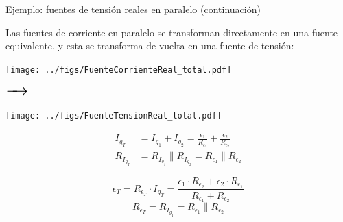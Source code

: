 \documentclass[aspectratio=169, xcolor={usenames,svgnames,dvipsnames}]{beamer}
\begin{document}
\begin{frame}{Ejemplo: \hspace{3mm}fuentes de tensión reales en paralelo \hspace{3mm}(continuación)}

    \vspace{2mm}
    Las fuentes de corriente en paralelo se transforman directamente en una fuente equivalente, y esta se transforma de vuelta en una fuente de tensión:

    \begin{minipage}[c]{0.45\linewidth}
        \begin{center}
        \texttt{[image: ../figs/FuenteCorrienteReal\_total.pdf]}
        \end{center}
    \end{minipage}
    \begin{minipage}[c]{0.08\linewidth}        
        $\LARGE \xrightarrow{\hspace*{0.5cm}}$        
    \end{minipage}
    \begin{minipage}[c]{0.3\linewidth}
        \begin{center}
        \texttt{[image: ../figs/FuenteTensionReal\_total.pdf]}
        \end{center}
    \end{minipage}

    \vspace{-2mm}
    \begin{minipage}[c]{0.45\linewidth}
        \begin{center}
            \begin{align*}
            I_{g_T} &= I_{g_1} + I_{g_2} = \frac{\epsilon_1}{R_{\epsilon_1}} + \frac{\epsilon_2}{R_{\epsilon_2}} \\[2pt]
            R_{I_{g_T}} &= R_{I_{g_1}} \parallel R_{I_{g_2}} = R_{\epsilon_1} \parallel R_{\epsilon_2}
            \end{align*}
        \end{center}
    \end{minipage}
    \begin{minipage}[c]{0.08\linewidth}  
        \hfill
    \end{minipage}
    \begin{minipage}[c]{0.3\linewidth}
        \[
            \boxed{ \epsilon_T = R_{\epsilon_T} \cdot I_{g_T} =  \frac{\epsilon_1 \cdot R_{\epsilon_2} + \epsilon_2 \cdot R_{\epsilon_1}}{R_{\epsilon_1} + R_{\epsilon_2}}}
        \]
        \vspace{-3mm}
        \[
            \boxed{ R_{\epsilon_T} = R_{I_{g_T}} = R_{\epsilon_1} \parallel R_{\epsilon_2} }
        \]
    \end{minipage}
\end{frame}
\end{document}
